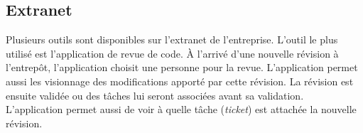 \subsection{Extranet}
Plusieurs outils sont disponibles sur l'extranet de l'entreprise. L'outil le plus utilisé est l'application de revue de code. \`A l'arrivé d'une nouvelle révision à l'entrepôt, l'application choisit une personne pour la revue. L'application permet aussi les visionnage des modifications apporté par cette révision. La révision est ensuite validée ou des tâches lui seront associées avant sa validation. L'application permet aussi de voir à quelle tâche (\textit{ticket}) est attachée la nouvelle révision.   
